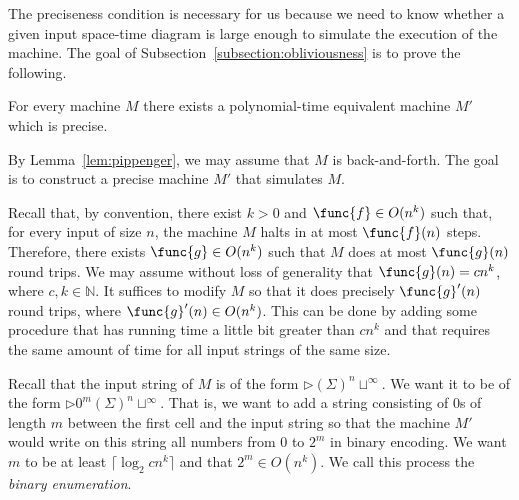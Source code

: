 \documentclass{lmcs}
\begin{document}
The preciseness condition is necessary for us because we need to know whether a given input space-time diagram is large enough to simulate the execution of the machine. The goal of Subsection~\ref{subsection:obliviousness} is to prove the following.
\begin{thm}\label{th:precise}
For every machine $M$ there exists a polynomial-time equivalent machine $M'$ which is precise.
\end{thm}
\proof
By Lemma~\ref{lem:pippenger}, we may assume that $M$ is back-and-forth. The goal is to construct a precise machine $M'$ that simulates $M$. 

Recall that, by convention, there exist $k>0$ and $\func{f}\in O(n^k)$ such that, for every input of size $n$, the machine $M$ halts in at most $\func{f}(n)$ steps. Therefore, there exists $\func{g}\in O(n^k)$ such that $M$ does at most $\func{g}(n)$ round trips. 
We may assume without loss of generality that $\func{g}(n)=cn^k$, where $c,k\in\mathbb{N}$. 
It suffices to modify $M$ so that it does precisely $\func{g}'(n)$ round trips, where $\func{g}'(n)\in O(n^k)$.
This can be done by adding some procedure that has running time a little bit greater than $cn^k$ and that requires the same amount of time for all input strings of the same size.

Recall that the input string of $M$ is of the form $\triangleright(\Sigma)^n\sqcup^\infty$. 
We want it to be of the form $\triangleright0^{m}(\Sigma)^n\sqcup^\infty$. 
That is, we want to add a string consisting of $0$s of length $m$ between the first cell and the input string so that the machine $M'$ would write on this string all numbers from $0$ to $2^{m}$ in binary encoding.
We want $m$ to be at least $\lceil\log_2 cn^k\rceil$ and that $2^m\in O(n^k)$.
We call this process the \emph{binary enumeration}. 
\end{document}
